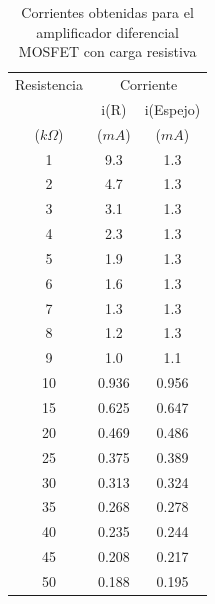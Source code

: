 \begin{table}[H]
\centering
\caption{Corrientes obtenidas para el amplificador diferencial MOSFET con carga resistiva}
\label{espejodiferencialbjt}
\begin{tabular}{ccc}
\hline 
Resistencia          & \multicolumn{2}{c}{Corriente}                \\
                     & i(R)                 & i(Espejo)             \\
($k\Omega$)          & ($mA$)               & ($mA$)                 \\
\hline 
\hline 
1	&	9.3	&	1.3	\\
2	&	4.7	&	1.3	\\
3	&	3.1	&	1.3	\\
4	&	2.3	&	1.3	\\
5	&	1.9	&	1.3	\\
6	&	1.6	&	1.3	\\
7	&	1.3	&	1.3	\\
8	&	1.2	&	1.3	\\
9	&	1.0	&	1.1	\\
10	&	0.936	&	0.956	\\
15	&	0.625	&	0.647	\\
20	&	0.469	&	0.486	\\
25	&	0.375	&	0.389	\\
30	&	0.313	&	0.324	\\
35	&	0.268	&	0.278	\\
40	&	0.235	&	0.244	\\
45	&	0.208	&	0.217	\\
50	&	0.188	&	0.195	\\
\hline 
\end{tabular}
\end{table}

